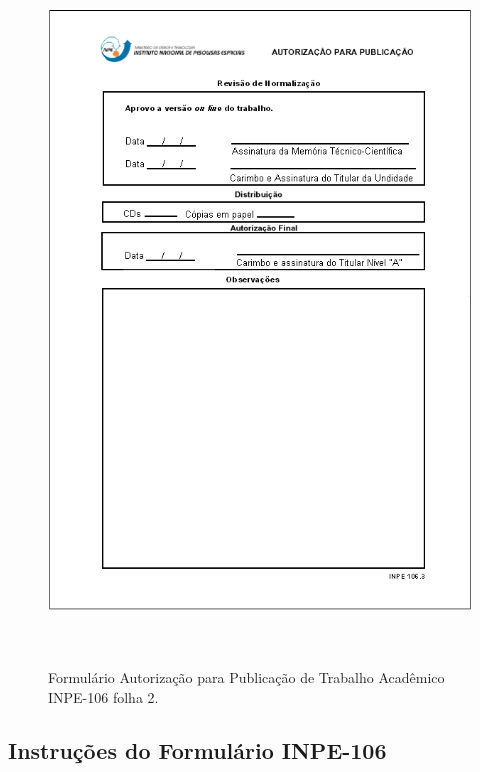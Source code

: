 \begin{figure}[ht!]
	\caption{Formulário Autorização para Publicação de Trabalho Acadêmico INPE-106 folha 2.} 
	\vspace{6mm}	%
	\centering
	\includegraphics[height=18cm]{./Figuras/form106folha2.png}
	\label{form106a}
\end{figure}

\clearpage
\subsection{Instruções do Formulário INPE-106} 
\label{instr106}


